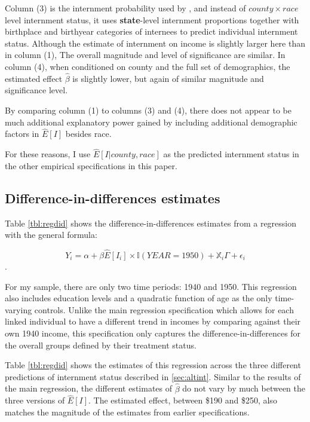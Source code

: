 \documentclass[12pt]{article}
\begin{document}
Column (3) is the internment probability used by \citet{arellano-boverDisplacementDiversityMobility2022},
and instead of \(county\times race\) level internment status,
it uses \textbf{state}-level internment proportions
together with birthplace and birthyear categories of internees
to predict individual internment status.
Although the estimate of internment on income is slightly larger here
than in column (1),
The overall magnitude and level of significance are similar.
In column (4), when conditioned on county and the full set of demographics,
the estimated effect \(\hat{\beta}\)  is slightly lower,
but again of similar magnitude and significance level.

By comparing column (1) to columns (3) and (4),
there does not appear to be much additional explanatory power gained
by including additional demographic factors in \(\hat{E}[I]\) besides race.

For these reasons, I use \(\hat{E}[I|county, race]\)
as the predicted internment status in the other empirical specifications
in this paper.
\subsection{Difference-in-differences estimates}
\label{sec:org943d6de}

Table \ref{tbl:regdid} shows the difference-in-differences estimates
from a regression with the general formula:

\begin{equation}\label{eq:didreg}
  Y_i = \alpha + \beta \hat{E}[I_i]\times\mathbb{I}(YEAR=1950)
        + \mathbb{X}_i \Gamma + \epsilon_i
\end{equation}.

For my sample, there are only two time periods: 1940 and 1950.
This regression also includes education levels and a quadratic function of age
as the only time-varying controls.
Unlike the main regression specification which allows for each linked individual
to have a different trend in incomes by comparing against their own 1940 income,
this specification only captures the difference-in-differences for the overall
groups defined by their treatment status.



Table \ref{tbl:regdid} shows the estimates of this regression across
the three different predictions of internment status described in \ref{sec:altint}.
Similar to the results of the main regression, the different estimates
of \(\hat{\beta}\) do not vary by much between the three versions of \(\hat{E}[I]\).
The estimated effect, between \$190 and \$250, also matches the
magnitude of the estimates from earlier specifications.
\end{document}
